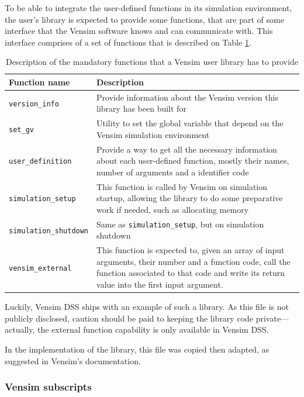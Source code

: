 To be able to integrate the user-defined functions in its simulation environment, the user's library is expected to provide some functions, that are part of some interface that the Vensim software knows and can communicate with. This interface comprises of a set of functions that is described on Table \ref{table:vensim-interface}.
\begin{table}[h]
    \centering
    \begin{tabular}{|m{4.1cm}|m{12cm}|}
        \hline
        Function name & Description \\ \hline
        \texttt{version\_info} & Provide information about the Vensim version this library has been built for \\
        \texttt{set\_gv} & Utility to set the global variable that depend on the Vensim simulation environment \\
        \texttt{user\_definition} & Provide a way to get all the necessary information about each user-defined function, mostly their names, number of arguments and a identifier code \\
        \texttt{simulation\_setup} & This function is called by Vensim on simulation startup, allowing the library to do some preparative work if needed, such as allocating memory \\
        \texttt{simulation\_shutdown} & Same as \texttt{simulation\_setup}, but on simulation shutdown \\
        \texttt{vensim\_external} & This function is expected to, given an array of input arguments, their number and a function code, call the function associated to that code and write its return value into the first input argument.\\
        \hline
    \end{tabular}
    \caption{Description of the mandatory functions that a Vensim user library has to provide}
    \label{table:vensim-interface}
\end{table}

Luckily, %
Vensim DSS ships with an example of such a library. As this file is not publicly disclosed, caution should be paid to keeping the library code private---actually, the external function capability is only available in Vensim DSS.

In the implementation of the library, this file was copied then adapted, as suggested in Vensim's documentation.

\subsubsection{Vensim subscripts}

